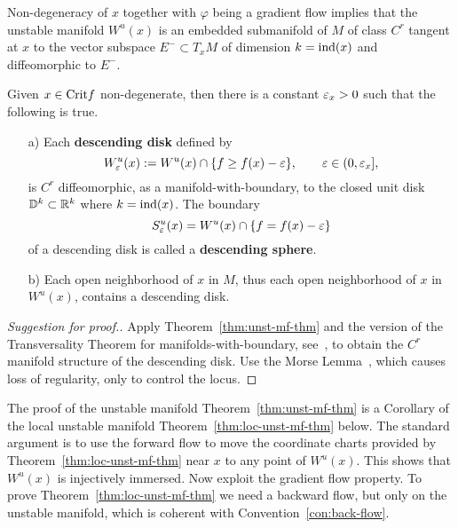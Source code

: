 \documentclass{article}
\begin{document}
\begin{theorem}\label{thm:unst-mf-thm}
Non-degeneracy of $x$ together with $\varphi$ being a gradient flow
implies that the unstable manifold $W^u(x)$
is an embedded submanifold of $M$ of class $C^r$
tangent at $x$ to the vector subspace $E^-\subset T_xM$
of dimension $k={\rm ind}(x)$ and diffeomorphic to $E^-$.
\end{theorem}

\begin{corollary}\label{cor:desc-disk}
Given $x\in{\rm Crit} f$ non-degenerate, then
there is a constant ${\varepsilon}_x>0$ such that the following is true.
\begin{enumerate}
\item[{\rm a)}]
  Each {\bf descending disk} defined by
  \begin{equation}\label{eq:def-desc-disk}
     W^u_\eps(x):=W^u(x)\cap\{f\ge f(x)-\eps\},\qquad
     \eps\in(0,\eps_x],
  \end{equation}
  is $C^r$ diffeomorphic, as a manifold-with-boundary,
  to the closed unit disk ${\mathbb{D}}^k\subset{\mathbb{R}}^k$ where $k={\rm ind}(x)$.
  The boundary
  $$
     S^u_{\varepsilon}(x)=W^u(x)\cap\{f= f(x)-{\varepsilon}\}
  $$
  of a descending disk is called a {\bf descending sphere}.
\item[{\rm b)}]
  Each open neighborhood of $x$ in $M$,
  thus each open neighborhood of $x$ in $W^u(x)$,
  contains a descending disk.
\end{enumerate}
\end{corollary}

\begin{proof}[Suggestion for proof.]
Apply Theorem~\ref {thm:unst-mf-thm} and the version
of the Transversality Theorem for manifolds-with-boundary, see~\cite[Ch.~1 \S 4]{hirsch:1976a},
to obtain the $C^r$ manifold structure of the descending disk.
Use the Morse Lemma~\cite{hirsch:1976a}, which causes loss
of regularity, only to control the locus.
\end{proof}

The proof of the unstable manifold Theorem~\ref{thm:unst-mf-thm}
is a Corollary of the local unstable manifold
Theorem~\ref{thm:loc-unst-mf-thm} below. The standard argument is
to use the forward flow to move the coordinate charts provided by
Theorem~\ref{thm:loc-unst-mf-thm} near $x$ to any point of $W^u(x)$.
This shows that $W^u(x)$ is injectively immersed. Now exploit the
gradient flow property. To prove Theorem~\ref{thm:loc-unst-mf-thm}
we need a backward flow, but only on the unstable
manifold, which is coherent with Convention~\ref{con:back-flow}.
\end{document}
